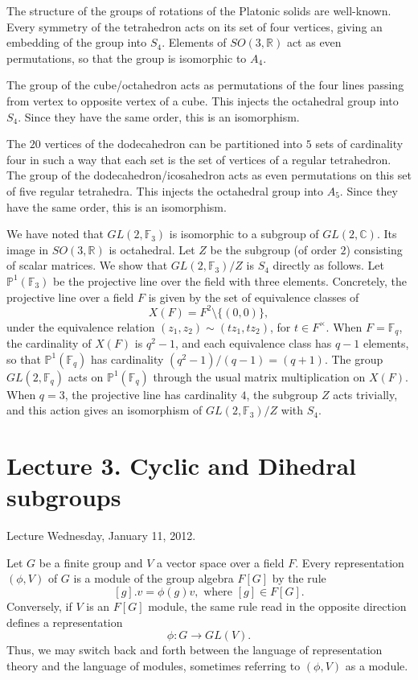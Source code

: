 \documentclass{llncs}
\newcommand{\ring}[1]{\mathbb{#1}}
\begin{document}
The structure of the groups of rotations of the Platonic solids are well-known.
Every symmetry of the tetrahedron acts on its set of four vertices, giving
an embedding of the group into $S_4$.  Elements of $SO(3,\ring{R})$ act as
even permutations, so that the group is isomorphic to $A_4$.

The group of the cube/octahedron acts as permutations of the four lines passing
from vertex to opposite vertex of a cube.  This injects the octahedral group
into $S_4$.  Since they have the same order, this is an isomorphism.

The $20$ vertices of the dodecahedron can be partitioned into $5$ sets of cardinality
four in such a way that each set is the set of vertices of a regular tetrahedron.
The group of the dodecahedron/icosahedron acts as even permutations on this set of five
regular tetrahedra.  This injects the octahedral group into $A_5$.  Since they
have the same order, this is an isomorphism.

We have noted that $GL(2,\ring{F}_3)$ is isomorphic to a subgroup of
$GL(2,\ring{C})$.  Its image in $SO(3,\ring{R})$ is octahedral.  Let
$Z$ be the subgroup (of order $2$) consisting of scalar matrices.  We
show that $GL(2,\ring{F}_3)/Z$ is $S_4$ directly as follows.  Let
$\ring{P}^1(\ring{F}_3)$ be the projective line over the field with
three elements.  Concretely, the projective line over a field $F$ is
given by the set of equivalence classes of
\[
X(F)=F^2 \setminus \{(0,0)\},
\]
under the equivalence relation $(z_1,z_2)\sim (t z_1,t z_2)$, for
$t\in F^\times$.  When $F=\ring{F}_q$, the cardinality of $X(F)$ is
$q^2-1$, and each equivalence class has $q-1$ elements, so that
$\ring{P}^1(\ring{F}_q)$ has cardinality $(q^2-1)/(q-1)=(q+1)$.  The
group $GL(2,\ring{F}_q)$ acts on $\ring{P}^1(\ring{F}_q)$ through the
usual matrix multiplication on $X(F)$.  When $q=3$, the projective
line has cardinality $4$, the subgroup $Z$ acts trivially, and this
action gives an isomorphism of $GL(2,\ring{F}_3)/Z$ with $S_4$.


\newpage
\section{Lecture 3.  Cyclic and Dihedral subgroups}

Lecture Wednesday, January 11, 2012.


Let $G$ be a finite group and $V$ a vector space over a field $F$.  
Every representation $(\phi,V)$ of $G$
is a module of the group algebra $F[G]$ by the rule 
\[
[g].v = \phi(g)v, \text{ where } [g]\in F[G].
\]
Conversely, if $V$ is an $F[G]$ module, the same rule read in the opposite
direction defines a representation
\[
\phi:G\to GL(V).
\]
Thus, we may switch back and forth between the language of representation
theory and the language of modules, sometimes referring to $(\phi,V)$ as
a module.
\end{document}
